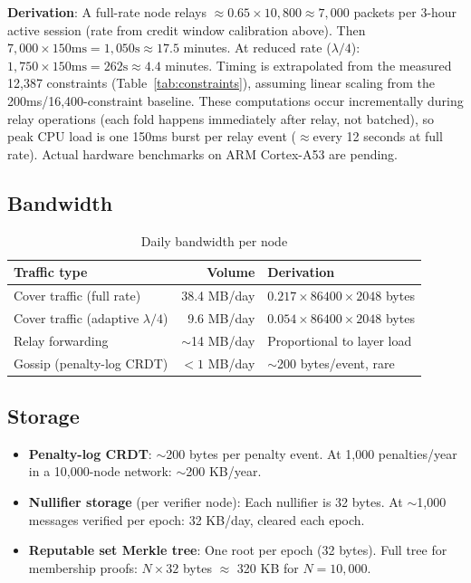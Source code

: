 \documentclass[11pt,a4paper]{article}
\begin{document}
\textbf{Derivation}: A full-rate node relays $\approx 0.65 \times 10{,}800 \approx 7{,}000$ packets per 3-hour active session (rate from credit window calibration above). Then $7{,}000 \times 150\text{ms} = 1{,}050\text{s} \approx 17.5$ minutes. At reduced rate ($\lambda/4$): $1{,}750 \times 150\text{ms} = 262\text{s} \approx 4.4$ minutes. Timing is extrapolated from the measured 12,387 constraints (Table~\ref{tab:constraints}), assuming linear scaling from the 200ms/16,400-constraint baseline. These computations occur incrementally during relay operations (each fold happens immediately after relay, not batched), so peak CPU load is one 150ms burst per relay event ($\approx$every 12 seconds at full rate). Actual hardware benchmarks on ARM Cortex-A53 are pending.

\subsection{Bandwidth}

\begin{table}[h]
\centering
\caption{Daily bandwidth per node}
\begin{tabular}{@{}lrl@{}}
\toprule
Traffic type & Volume & Derivation \\
\midrule
Cover traffic (full rate) & 38.4 MB/day & $0.217 \times 86400 \times 2048$ bytes \\
Cover traffic (adaptive $\lambda/4$) & 9.6 MB/day & $0.054 \times 86400 \times 2048$ bytes \\
Relay forwarding & $\sim$14 MB/day & Proportional to layer load \\
Gossip (penalty-log CRDT) & $< 1$ MB/day & $\sim$200 bytes/event, rare \\
\bottomrule
\end{tabular}
\end{table}

\subsection{Storage}

\begin{itemize}[nosep]
    \item \textbf{Penalty-log CRDT}: $\sim$200 bytes per penalty event. At 1,000 penalties/year in a 10,000-node network: $\sim$200 KB/year.
    \item \textbf{Nullifier storage} (per verifier node): Each nullifier is 32 bytes. At $\sim$1,000 messages verified per epoch: 32 KB/day, cleared each epoch.
    \item \textbf{Reputable set Merkle tree}: One root per epoch (32 bytes). Full tree for membership proofs: $N \times 32$ bytes $\approx$ 320 KB for $N = 10{,}000$.
\end{itemize}
\end{document}
